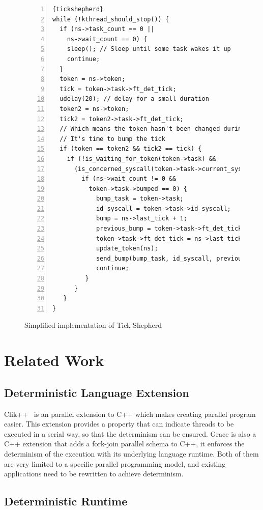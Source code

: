 \begin{figure}
\begin{lstlisting}[numbers=left, frame=single, basicstyle=\small, breaklines]{tickshepherd}
while (!kthread_should_stop()) {
  if (ns->task_count == 0 ||
    ns->wait_count == 0) {
    sleep(); // Sleep until some task wakes it up
    continue;
  }
  token = ns->token;
  tick = token->task->ft_det_tick;
  udelay(20); // delay for a small duration
  token2 = ns->token;
  tick2 = token2->task->ft_det_tick;
  // Which means the token hasn't been changed during the delay,
  // It's time to bump the tick
  if (token == token2 && tick2 == tick) {
    if (!is_waiting_for_token(token->task) &&
      (is_concerned_syscall(token->task->current_syscall)) {
        if (ns->wait_count != 0 &&
          token->task->bumped == 0) {
            bump_task = token->task;
            id_syscall = token->task->id_syscall;
            bump = ns->last_tick + 1;
            previous_bump = token->task->ft_det_tick;
            token->task->ft_det_tick = ns->last_tick + 1;
            update_token(ns);
            send_bump(bump_task, id_syscall, previous_bump, bump);
            continue;
         }
      }
   }
}
\end{lstlisting}
\caption{Simplified implementation of Tick Shepherd}
\label{f:tickbump_code}
\end{figure}

\section{Related Work}

\subsection{Deterministic Language Extension}
Clik++~\cite{leiserson2010cilk++} is an parallel extension to C++ which makes creating parallel program easier. This extension provides a property that can indicate threads to be executed in a serial way, so that the determinism can be ensured. Grace \cite{berger2009grace} is also a C++ extension that adds a fork-join parallel schema to C++, it enforces the determinism of the execution with its underlying language runtime. Both of them are very limited to a specific parallel programming model, and existing applications need to be rewritten to achieve determinism.

\subsection{Deterministic Runtime}
